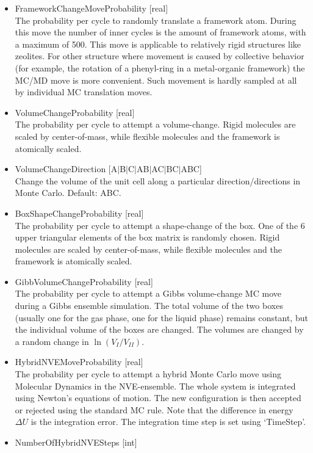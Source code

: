 \begin{itemize}
\item{FrameworkChangeMoveProbability [real]}\\
The probability per cycle to randomly translate a framework atom. During this move the number of inner cycles is the amount of framework atoms, with a maximum of 500.
This move is applicable to relatively rigid structures like zeolites. For other structure where movement is caused by collective behavior (for example, the rotation of a phenyl-ring
in a metal-organic framework) the MC/MD move is more convenient. Such movement is hardly sampled at all by individual MC translation moves.
\item{VolumeChangeProbability [real]}\\
The probability per cycle to attempt a volume-change. Rigid molecules are scaled by center-of-mass, while flexible molecules and the framework is atomically scaled.
\item{VolumeChangeDirection [A$|$B$|$C$|$AB$|$AC$|$BC$|$ABC]}\\
Change the volume of the unit cell along a particular direction/directions in Monte Carlo. Default: ABC.
\item{BoxShapeChangeProbability [real]}\\
The probability per cycle to attempt a shape-change of the box. One of the 6 upper triangular elements of the box matrix is randomly chosen.
Rigid molecules are scaled by center-of-mass, while flexible molecules and the framework is atomically scaled.
\item{GibbVolumeChangeProbability [real]}\\
The probability per cycle to attempt a Gibbs volume-change MC move during a Gibbs ensemble simulation. The total volume of the two boxes 
(usually one for the gas phase, one for the liquid phase) remains constant, but the individual volume of the boxes are changed.
The volumes are changed by a random change in $\ln(V_I/V_{II})$.
\item{HybridNVEMoveProbability [real]}\\
The probability per cycle to attempt a hybrid Monte Carlo move using Molecular Dynamics in the NVE-ensemble.
The whole system is integrated using Newton's equations of motion. The new configuration
is then accepted or rejected using the standard MC rule. Note that the difference in energy $\Delta U$ is the integration error. The integration time step is set using
`TimeStep'.
\item{NumberOfHybridNVESteps [int]}\\

\end{itemize}
